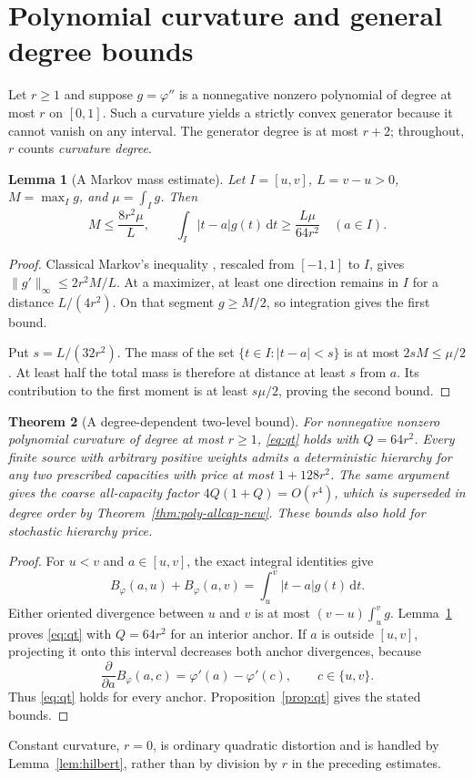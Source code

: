 \documentclass[11pt]{article}
\newtheorem{theorem}{Theorem}[section]
\newtheorem{lemma}[theorem]{Lemma}
\theoremstyle{definition}\newtheorem{definition}[theorem]{Definition}
\theoremstyle{remark}\newtheorem{remark}[theorem]{Remark}
\newcommand{\ph}{\varphi}
\newcommand{\B}{B_{\ph}}
\newcommand{\rd}{\,\mathrm d}
\begin{document}
\section{Polynomial curvature and general degree bounds}
\label{sec:polynomialupper}
Let $r\ge1$ and suppose $g=\ph''$ is a nonnegative nonzero polynomial of degree at most $r$ on $[0,1]$. Such a curvature yields a strictly convex generator because it cannot vanish on any interval. The generator degree is at most $r+2$; throughout, $r$ counts \emph{curvature degree}.

\begin{lemma}[A Markov mass estimate]
\label{lem:markov}
Let $I=[u,v]$, $L=v-u>0$, $M=\max_I g$, and $\mu=\int_I g$. Then
\begin{equation}
M\le\frac{8r^2\mu}{L},\qquad
\int_I|t-a|g(t)\rd t\ge\frac{L\mu}{64r^2}\quad(a\in I).
\label{eq:markovmass}
\end{equation}
\end{lemma}
\begin{proof}
Classical Markov's inequality \cite{shadrin}, rescaled from $[-1,1]$ to $I$, gives $\|g'\|_\infty\le2r^2M/L$. At a maximizer, at least one direction remains in $I$ for a distance $L/(4r^2)$. On that segment $g\ge M/2$, so integration gives the first bound.

Put $s=L/(32r^2)$. The mass of the set $\{t\in I:|t-a|<s\}$ is at most $2sM\le\mu/2$. At least half the total mass is therefore at distance at least $s$ from $a$. Its contribution to the first moment is at least $s\mu/2$, proving the second bound.
\end{proof}

\begin{theorem}[A degree-dependent two-level bound]
\label{thm:polyupper}
For nonnegative nonzero polynomial curvature of degree at most $r\ge1$, \eqref{eq:qt} holds with $Q=64r^2$. Every finite source with arbitrary positive weights admits a deterministic hierarchy for any two prescribed capacities with price at most $1+128r^2$. The same argument gives the coarse all-capacity factor $4Q(1+Q)=O(r^4)$, which is superseded in degree order by Theorem~\ref{thm:poly-allcap-new}. These bounds also hold for stochastic hierarchy price.
\end{theorem}
\begin{proof}
For $u<v$ and $a\in[u,v]$, the exact integral identities give
\[
\B(a,u)+\B(a,v)=\int_u^v|t-a|g(t)\rd t.
\]
Either oriented divergence between $u$ and $v$ is at most $(v-u)\int_u^v g$. Lemma~\ref{lem:markov} proves \eqref{eq:qt} with $Q=64r^2$ for an interior anchor. If $a$ is outside $[u,v]$, projecting it onto this interval decreases both anchor divergences, because
\[
\frac{\partial}{\partial a}\B(a,c)=\ph'(a)-\ph'(c),\qquad c\in\{u,v\}.
\]
Thus \eqref{eq:qt} holds for every anchor. Proposition~\ref{prop:qt} gives the stated bounds.
\end{proof}
Constant curvature, $r=0$, is ordinary quadratic distortion and is handled by Lemma~\ref{lem:hilbert}, rather than by division by $r$ in the preceding estimates.
\end{document}
